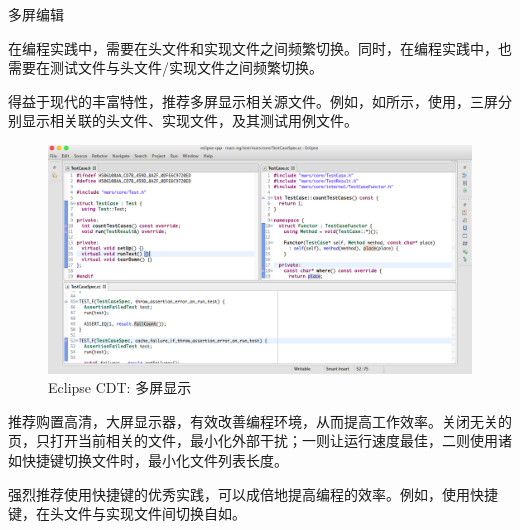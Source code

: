 \begin{content}
\begin{episode}{多屏编辑}
\begin{content}

在\cpp{}编程实践中，需要在头文件和实现文件之间频繁切换。同时，在编程实践中，也需要在测试文件与头文件/实现文件之间频繁切换。

得益于现代的丰富特性，推荐多屏显示相关源文件。例如，如所示，使用，三屏分别显示相关联的头文件、实现文件，及其测试用例文件。

\begin{figure}[H]
\centering
\includegraphics[width=1.0\textwidth]{figures/xunit/multi-editor-eclipse.png}
\caption{Eclipse CDT: 多屏显示}
 \label{fig:multi-editor-eclipse}
\end{figure}

推荐购置高清，大屏显示器，有效改善编程环境，从而提高工作效率。关闭无关的页，只打开当前相关的文件，最小化外部干扰；一则让运行速度最佳，二则使用诸如快捷键切换文件时，最小化文件列表长度。

强烈推荐使用快捷键的优秀实践，可以成倍地提高编程的效率。例如，使用快捷键，在头文件与实现文件间切换自如。

\end{content}

\end{episode}

\end{content}


